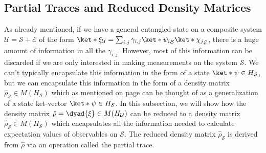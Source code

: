 \documentclass[12pt]{report}
\begin{document}
    \subsection{Partial Traces and Reduced Density Matrices}
    As already mentioned, if we have a general entangled state on a composite system $\mathcal{U}=\mathcal{S}+\mathcal{E}$ of the form  $\ket*{\xi}_\mathcal{U}=\sum_{i,j}\gamma_{i,j}\ket*{\psi_i}_\mathcal{S}\ket*{\chi_j}_\mathcal{E}$, there is a huge amount of information in all the $\gamma_{i,j}$. However, most of this information can be discarded if we are only interested in making measurements on the system $\mathcal{S}$. We can't typically encapsulate this information in the form of a state $\ket*{\psi}\in H_\mathcal{S}$, but we can encapsulate this information in the form of a density matrix $\hat{\rho}_\mathcal{S}\in M(H_\mathcal{S})$ which as mentioned on page \pageref{genket} can be thought of as a generalization of a state ket-vector $\ket*{\psi}\in H_\mathcal{S}$. In this subsection, we will show how the density matrix $\hat{\rho}=\dyad{\xi}\in M(H_\mathcal{U})$ can be reduced to a density matrix $\hat{\rho}_\mathcal{S}\in M(H_\mathcal{S})$ which encapsulates all the information needed to calculate expectation values of observables on $\mathcal{S}$. The reduced density matrix $\hat{\rho}_\mathcal{S}$ is derived from $\hat{\rho}$ via an operation called the partial trace.
    
\end{document}
